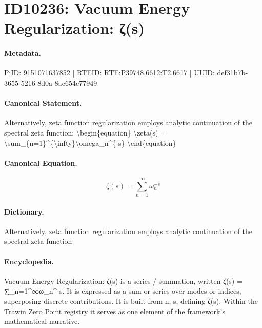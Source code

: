\section*{ID10236: Vacuum Energy Regularization: ζ(s)}
\paragraph{Metadata.}
PiID: 9151071637852 | RTEID: RTE:P39748.6612:T2.6617 | UUID: def31b7b-3655-5216-8d0a-8ac654e77949

\paragraph{Canonical Statement.}
Alternatively, zeta function regularization employs analytic continuation of the spectral zeta function: \textbackslash{}begin\{equation\} \textbackslash{}zeta(s) = \textbackslash{}sum\_\{n=1\}\textasciicircum{}\{\textbackslash{}infty\}\textbackslash{}omega\_n\textasciicircum{}\{-s\} \textbackslash{}end\{equation\}

\paragraph{Canonical Equation.}
\[
\zeta(s) = \sum_{n=1}^{\infty}\omega_n^{-s}
\]

\paragraph{Dictionary.}
Alternatively, zeta function regularization employs analytic continuation of the spectral zeta function

\paragraph{Encyclopedia.}
Vacuum Energy Regularization: ζ(s) is a series / summation, written ζ(s) = ∑\_n=1\textasciicircum{}∞ω\_n\textasciicircum{}-s. It is expressed as a sum or series over modes or indices, superposing discrete contributions. It is built from n, s, defining ζ(s). Within the Trawin Zero Point registry it serves as one element of the framework's mathematical narrative.
